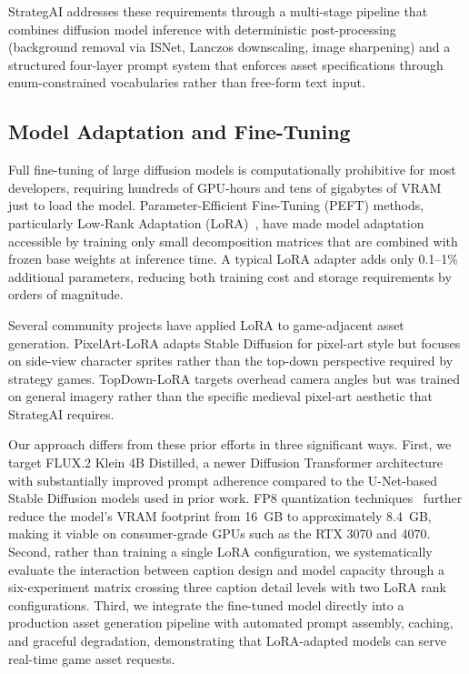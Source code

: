 \documentclass[conference]{IEEEtran}
\begin{document}
StrategAI addresses these requirements through a multi-stage pipeline that combines diffusion model inference with deterministic post-processing (background removal via ISNet, Lanczos downscaling, image sharpening) and a structured four-layer prompt system that enforces asset specifications through enum-constrained vocabularies rather than free-form text input.

\subsection{Model Adaptation and Fine-Tuning}

Full fine-tuning of large diffusion models is computationally prohibitive for most developers, requiring hundreds of GPU-hours and tens of gigabytes of VRAM just to load the model. Parameter-Efficient Fine-Tuning (PEFT) methods, particularly Low-Rank Adaptation (LoRA)~\cite{hu2022lora}, have made model adaptation accessible by training only small decomposition matrices that are combined with frozen base weights at inference time. A typical LoRA adapter adds only 0.1--1\% additional parameters, reducing both training cost and storage requirements by orders of magnitude.

Several community projects have applied LoRA to game-adjacent asset generation. PixelArt-LoRA adapts Stable Diffusion for pixel-art style but focuses on side-view character sprites rather than the top-down perspective required by strategy games. TopDown-LoRA targets overhead camera angles but was trained on general imagery rather than the specific medieval pixel-art aesthetic that StrategAI requires.

Our approach differs from these prior efforts in three significant ways. First, we target FLUX.2 Klein 4B Distilled, a newer Diffusion Transformer architecture~\cite{peebles2023scalable} with substantially improved prompt adherence compared to the U-Net-based Stable Diffusion models used in prior work. FP8 quantization techniques~\cite{lin2024fp8} further reduce the model's VRAM footprint from 16~GB to approximately 8.4~GB, making it viable on consumer-grade GPUs such as the RTX 3070 and 4070. Second, rather than training a single LoRA configuration, we systematically evaluate the interaction between caption design and model capacity through a six-experiment matrix crossing three caption detail levels with two LoRA rank configurations. Third, we integrate the fine-tuned model directly into a production asset generation pipeline with automated prompt assembly, caching, and graceful degradation, demonstrating that LoRA-adapted models can serve real-time game asset requests.
\end{document}
